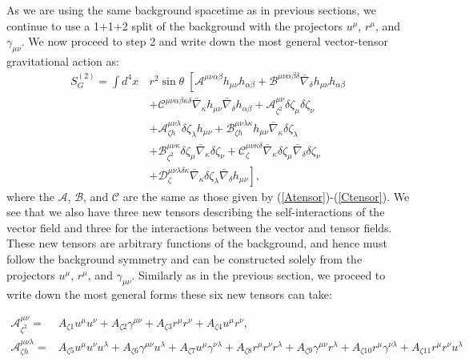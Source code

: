 \documentclass[10pt,twocolumn,preprintnumbers,amsmath,amssymb,nofootinbib
,superscriptaddress]{revtex4-1}
\begin{document}
{As we are using the same background spacetime as in previous sections, we continue to use a 1+1+2 split of the background with the projectors $u^\mu$, $r^\mu$, and $\gamma_{\mu\nu}$. We now proceed to step 2 and write down the most general vector-tensor gravitational action as:
\begin{align}
 S_G^{(2)}=\int d^4x\,&r^2\sin\theta\; \left[\mathcal{A}^{\mu\nu\alpha\beta} h_{\mu\nu} h_{\alpha\beta}
 + \mathcal{B}^{\mu\nu\alpha\beta\delta}\bar{\nabla}_{\delta} h_{\mu\nu} h_{\alpha\beta}
\right. \nonumber\\
&\left.+ \mathcal{C}^{\mu\nu\alpha\beta\kappa\delta}\bar{\nabla}_{\kappa} h_{\mu\nu} \bar{\nabla}_{\delta} h_{\alpha\beta}+\mathcal{A}_{\zeta^2}^{\mu\nu}\delta\zeta_\mu \delta\zeta_\nu\right. \nonumber\\
&\left.+\mathcal{A}_{\zeta h}^{\mu\nu\lambda}\delta\zeta_\lambda h_{\mu\nu}+\mathcal{B}_{\zeta h}^{\mu\nu\lambda\kappa}h_{\mu\nu}\bar{\nabla}_\kappa\delta\zeta_\lambda \right. \nonumber\\
&\left.+\mathcal{B}_{\zeta^2}^{\mu\nu\kappa}\delta\zeta_\mu\bar{\nabla}_\kappa\delta\zeta_\nu+\mathcal{C}_\zeta^{\mu\nu\kappa\delta}\bar{\nabla}_\kappa\delta\zeta_\mu\bar{\nabla}_\delta\delta\zeta_\nu\right.\nonumber\\
&\left.+\mathcal{D}_\zeta^{\mu\nu\lambda\delta\kappa}\bar{\nabla}_\kappa\delta\zeta_\lambda\bar{\nabla}_\delta h_{\mu\nu}\right], \label{SgenVT}
\end{align}
where the $\mathcal{A}$, $\mathcal{B}$, and $\mathcal{C}$ are the same as those given by (\ref{Atensor})-(\ref{Ctensor}). We see that we also have three new tensors describing the self-interactions of the vector field and three for the interactions between the vector and tensor fields. These new tensors are arbitrary functions of the background, and hence must follow the background symmetry and can be constructed solely from the projectors $u^\mu$, $r^\mu$, and $\gamma_{\mu\nu}$. Similarly as in the previous section, we proceed to write down the most general forms these six new tensors can take: 
\begin{widetext}
\begin{align}
\mathcal{A}_{\zeta^2}^{\mu\nu}=&A_{\zeta1}u^\mu u^\nu + A_{\zeta2}\gamma^{\mu\nu} + A_{\zeta3}r^\mu r^\nu + A_{\zeta4}u^\mu r^\nu, \\
\mathcal{A}_{\zeta h}^{\mu\nu\lambda}=&A_{\zeta5}u^\mu u^\nu u^\lambda + A_{\zeta6} \gamma^{\mu\nu}u^\lambda +A_{\zeta7}u^\mu \gamma^{\nu\lambda}+A_{\zeta8}r^\mu r^\nu r^\lambda + A_{\zeta9} \gamma^{\mu\nu}r^\lambda +A_{\zeta10}r^\mu \gamma^{\nu\lambda} +A_{\zeta11} r^\mu r^\nu u^\lambda\nonumber\\

\end{align}
\end{widetext}}
\end{document}
